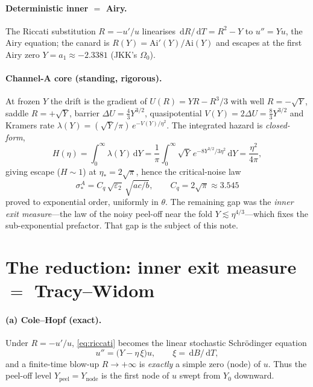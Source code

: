 \documentclass[11pt]{article}
\theoremstyle{remark}
\newcommand{\dd}{\,\mathrm{d}}
\newcommand{\Ynode}{Y_{\mathrm{node}}}
\newcommand{\Ypeel}{Y_{\mathrm{peel}}}
\begin{document}
\paragraph{Deterministic inner $=$ Airy.} The Riccati substitution $R=-u'/u$
linearises $\dd R/\dd T=R^2-Y$ to $u''=Yu$, the Airy equation; the canard is
$R(Y)=\mathrm{Ai}'(Y)/\mathrm{Ai}(Y)$ and escapes at the first Airy zero
$Y=a_1\approx-2.3381$ (JKK's $\Omega_0$).

\paragraph{Channel-A core (standing, rigorous).} At frozen $Y$ the drift is the
gradient of $U(R)=YR-R^3/3$ with well $R=-\sqrt Y$, saddle $R=+\sqrt Y$, barrier
$\Delta U=\tfrac43 Y^{3/2}$, quasipotential $V(Y)=2\Delta U=\tfrac83Y^{3/2}$ and
Kramers rate $\lambda(Y)=(\sqrt Y/\pi)\,e^{-V(Y)/\eta^2}$. The integrated hazard is
\emph{closed-form},
\begin{equation}\label{eq:hazard}
  H(\eta)=\int_0^\infty\lambda(Y)\dd Y
        =\frac1\pi\int_0^\infty\!\sqrt Y\,e^{-8Y^{3/2}/3\eta^2}\dd Y
        =\frac{\eta^2}{4\pi},
\end{equation}
giving escape ($H\sim1$) at $\eta_*=2\sqrt\pi$, hence the critical-noise law
\begin{equation}\label{eq:sigmastar}
  \boxed{\;\sigma_*^A = C_q\,\sqrt{\varepsilon_2}\,\sqrt{ac/b},\qquad C_q=2\sqrt\pi\approx3.545\;}
\end{equation}
proved to exponential order, uniformly in $\theta$. The remaining gap was the
\emph{inner exit measure}---the law of the noisy peel-off near the fold
$Y\lesssim\eta^{4/3}$---which fixes the sub-exponential prefactor. That gap is the
subject of this note.

\section{The reduction: inner exit measure $=$ Tracy--Widom}\label{sec:reduction}

\paragraph{(a) Cole--Hopf (exact).} Under $R=-u'/u$, \eqref{eq:riccati} becomes the
linear stochastic Schr\"odinger equation
\begin{equation}\label{eq:colehopf}
  u'' = \bigl(Y-\eta\,\xi\bigr)u,\qquad \xi=\dd B/\dd T,
\end{equation}
and a finite-time blow-up $R\to+\infty$ is \emph{exactly} a simple zero (node) of
$u$. Thus the peel-off level $\Ypeel=\Ynode$ is the first node of $u$ swept from
$Y_0$ downward.
\end{document}
